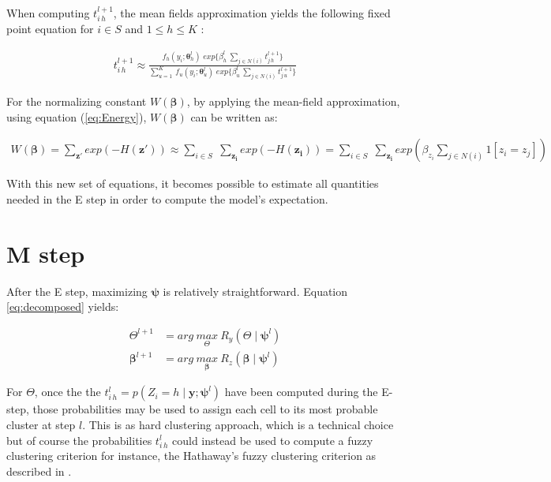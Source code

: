 When computing $t_{i\,h}^{l+1}$, the mean fields approximation yields the following fixed point equation for $i \in S$ and $1 \leq h \leq K$ \cite{Dang98}:

\begin{align}
\label{eq:fixedpoint}
t_{i\,h}^{l+1} \approx \frac{f_{h} (y_i;\boldsymbol{\theta}_{h}^l)\; exp\{\beta_h^l \: \sum_{j \in N(i)} t_{j\,h}^{l+1}\}}{\sum_{u=1}^K \: f_{u} (y_i;\boldsymbol{\theta}_{u}^l)\; exp\{\beta_u^l \: \sum_{j \in N(i)} t_{j\,u}^{l+1}\}}
\end{align}


For the normalizing constant $W(\boldsymbol{\beta})$, by applying the mean-field approximation, using equation (\ref{eq:Energy}), $W(\boldsymbol{\beta})$ can be written as:

\begin{align*}
W(\boldsymbol{\beta}) = \sum\limits_{\boldsymbol{z'}} exp(-H(\boldsymbol{z'})) \approx \sum\limits_{i \in S}\;\sum\limits_{\boldsymbol{z_i}} exp(-H(\boldsymbol{z_i})) = \sum\limits_{i \in S}\;\sum\limits_{\boldsymbol{z_i}} exp(\beta_{z_i}\sum\limits_{j \in N(i)}1[z_i=z_j])
\end{align*}

With this new set of equations, it becomes possible to estimate all quantities needed in the E step in order to compute the model's expectation.\\

\section{M step}
After the E step, maximizing $\boldsymbol{\psi}$ is relatively straightforward. Equation \ref{eq:decomposed} yields:

\begin{align*}
\Theta^{l+1} &= arg\:\underset{\Theta}{max}\:R_y(\Theta\mid \boldsymbol{\psi}^l)\\
\boldsymbol{\beta}^{l+1} &= arg\:\underset{\boldsymbol{\beta}}{max}\:R_z(\boldsymbol{\beta}\mid \boldsymbol{\psi}^l)
\end{align*}

For $\Theta$, once the the $t_{i\,h}^{l} = p(Z_i = h \mid \boldsymbol{y};\boldsymbol{\psi}^{l})$ have been computed during the E-step, those probabilities may be used to assign each cell to its most probable cluster at step $l$. This is as hard clustering approach, which is a technical choice but of course the probabilities $t_{i\,h}^{l}$ could instead be used to compute a fuzzy clustering criterion for instance, the Hathaway's fuzzy clustering criterion as described in \cite{Dang98}.\\
 
